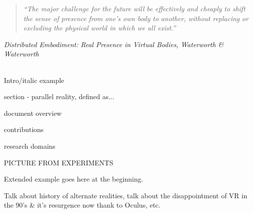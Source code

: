 \begin{quote}
	\textit{``The major challenge for the future will be effectively and cheaply to shift the sense of presence from one's own body to another, without replacing or excluding the physical world in which we all exist.''}
\end{quote}
\hfill \textit{Distributed Embodiment: Real Presence in Virtual Bodies, Waterworth \& Waterworth}
\\
\\

\label{introduction}


Intro/italic example

section - parallel reality, defined as...

document overview

contributions

research domains





















PICTURE FROM EXPERIMENTS














Extended example goes here at the beginning.




Talk about history of alternate realities, talk about the disappointment of VR in the 90's \& it's resurgence now thank to Oculus, etc.






